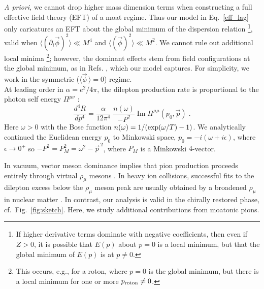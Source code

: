 \documentclass[twocolumn,prd,superscriptaddress, colorlinks, linkcolor=refcol, citecolor=refcol, urlcolor=refcol]{revtex4-2}
\newcommand{\photonSelfE}{\ensuremath{\Pi}}
\begin{document}
{\it A priori}, we cannot drop 
higher mass dimension terms 
when constructing a full effective field theory (EFT) of a moat regime.
Thus
our model in Eq.~\eqref{eff_lag} only caricatures an
EFT about the global minimum of the dispersion relation \footnote{If higher derivative terms dominate with negative coefficients, then even if $Z >0$, it is possible that $E(p)$ about $p=0$ is a local minimum, but that the global minimum of $E(p)$ is at $p\neq0$.},
valid when 
$\langle (\partial_i \vec{\phi})^2\rangle \ll M^4$ and 
$\langle (\vec{\phi})^2\rangle \ll M^2$.
We cannot rule out additional local minima \footnote{This occurs, e.g., for a roton, where $p = 0$
is the global minimum, but there is a local minimum for one or more
$p_{\rm roton} \neq 0$.}; however,
the dominant effects stem from field configurations at the global minimum,
as in Refs. \cite{Pisarski:2020gkx, Pisarski:2021qof,Rennecke:2023xhc}, which our model captures.
For simplicity, we work in the symmetric ($\langle \vec{\phi}\, \rangle = 0$)  regime.\\

At leading order in
$\alpha = e^2/4 \pi$, the dilepton production rate 
is proportional to the photon self energy
$\photonSelfE^{\mu \nu}$ \cite{McLerran:1984ay}:
\begin{equation}\label{eq:dilepton-production}
    \frac{d^4 R}{ dp^4} = \frac{\alpha}{12 \pi^4} \; 
    \frac{n(\omega)}{-P^2}\;  
    \mathrm{Im} \; \photonSelfE^{\mu \mu}(p_0, \vec{p})
    \; .
\end{equation}
Here $\omega > 0$ 
with the Bose function $n(\omega) = 1/({\rm exp}(\omega/T) -1 )$. 
We analytically
continued 
 the Euclidean energy $p_0$ to Minkowski space,  
$p_0 = - i (\omega + i \epsilon)$, where $\epsilon \to 0^+$
so $-P^2 = P_M^2 = \omega^2 - \vec{p}^{\, 2}$, where $P_M$ is a Minkowski $4$-vector.

In vacuum, vector meson dominance implies that pion production
proceeds entirely through virtual $\rho_\mu$ mesons
\cite{OConnell:1995nse}. In heavy ion collisions, successful
fits to the dilepton excess below the
$\rho_\mu$ meson peak are usually obtained by a broadened $\rho_\mu$ in nuclear matter
\cite{Rapp:1999ej,Rapp:2016xzw,Rapp:2024grb}.
In contrast, our analysis is valid in the chirally restored phase, cf.\ Fig.~\ref{fig:sketch}.
Here, we study additional contributions from moatonic pions.
\end{document}
